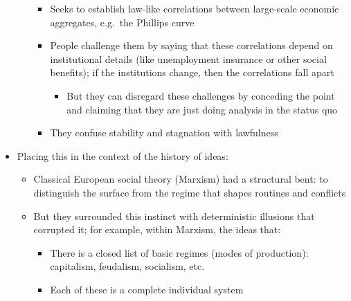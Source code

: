 \begin{itemize}
\begin{itemize}
    \begin{itemize}
    \tightlist
    \item
      Seeks to establish law-like correlations between large-scale
      economic aggregates, e.g.~the Phillips curve
    \item
      People challenge them by saying that these correlations depend on
      institutional details (like unemployment insurance or other social
      benefits); if the institutions change, then the correlations fall
      apart

      \begin{itemize}
      \tightlist
      \item
        But they can disregard these challenges by conceding the point
        and claiming that they are just doing analysis in the status quo
      \end{itemize}
    \item
      They confuse stability and stagnation with lawfulness
    \end{itemize}
  \end{itemize}
\item
  Placing this in the context of the history of ideas:

  \begin{itemize}
  \tightlist
  \item
    Classical European social theory (Marxism) had a structural bent: to
    distinguish the surface from the regime that shapes routines and
    conflicts
  \item
    But they surrounded this instinct with deterministic illusions that
    corrupted it; for example, within Marxism, the ideas that:

    \begin{itemize}
    \tightlist
    \item
      There is a closed list of basic regimes (modes of production):
      capitalism, feudalism, socialism, etc.
    \item
      Each of these is a complete individual system


\end{itemize}
\end{itemize}
\end{itemize}
